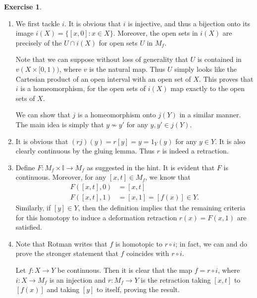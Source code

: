 \documentclass[10pt]{article}
\theoremstyle{definition}
\newtheorem{intex}{Exercise}[section]
\newenvironment{exercise}{\begin{intex}\label{\theintex}}{\end{intex}}
\newcommand*\II{\mathbb I}
\begin{document}
\begin{exercise} \leavevmode
\begin{enumerate}
\item We first tackle $i$. It is obvious that $i$ is injective, and thus a bijection onto its image $i(X)=\{[x,0]:x\in X\}$. Moreover, the open sets in $i(X)$ are precisely of the $U\cap i(X)$ for open sets $U$ in $M_f$. 

Note that we can suppose without loss of generality that $U$ is contained in $v(X\times[0,1))$, where $v$ is the natural map. Thus $U$ simply looks like the Cartesian product of an open interval with an open set of $X$. This proves that $i$ is a homeomorphism, for the open sets of $i(X)$ map exactly to the open sets of $X$. 

We can show that $j$ is a homeomorphism onto $j(Y)$ in a similar manner. The main idea is simply that $y\not\sim y'$ for any $y,y'\in j(Y)$. 

\item It is obvious that $(rj)(y)=r[y]=y=1_Y(y)$ for any $y\in Y$. It is also clearly continuous by the gluing lemma. Thus $r$ is indeed a retraction. 

\item Define $F:M_f\times\II\to M_f$ as suggested in the hint. It is evident that $F$ is continuous. Moreover, for any $[x,t]\in M_f$, we know that \begin{align*}F([x,t],0)&=[x,t]\\F([x,t],1)&=[x,1]=[f(x)]\in Y.\end{align*} Similarly, if $[y]\in Y$, then the definition implies that the remaining criteria for this homotopy to induce a deformation retraction $r(x)=F(x,1)$ are satisfied. 

\item Note that Rotman writes that $f$ is homotopic to $r\circ i$; in fact, we can and do prove the stronger statement that $f$ coincides with $r\circ i$. 

Let $f:X\to Y$ be continuous. Then it is clear that the map $f=r\circ i$, where $i:X\to M_f$ is an injection and $r:M_f\to Y$ is the retraction taking $[x,t]$ to $[f(x)]$ and taking $[y]$ to itself, proving the result. 
\end{enumerate} 
\end{exercise} 
\end{document}
